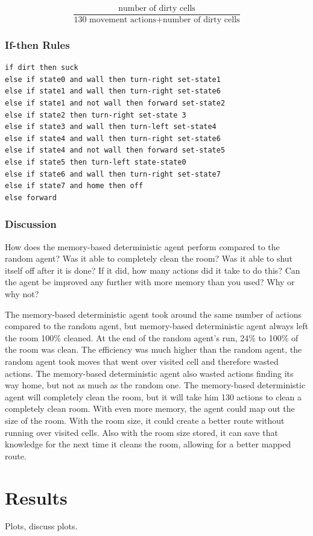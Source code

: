 \documentclass[a4paper,10pt]{article}
\begin{document}
\[\frac{\mbox{number of dirty cells}}{\mbox{130 movement actions} + \mbox{number of dirty cells}}\] 

\subsubsection{If-then Rules}
\begin{verbatim}
if dirt then suck
else if state0 and wall then turn-right set-state1
else if state1 and wall then turn-right set-state6
else if state1 and not wall then forward set-state2
else if state2 then turn-right set-state 3
else if state3 and wall then turn-left set-state4
else if state4 and wall then turn-right set-state6
else if state4 and not wall then forward set-state5
else if state5 then turn-left state-state0
else if state6 and wall then turn-right set-state7
else if state7 and home then off
else forward
\end{verbatim}

\subsubsection{Discussion}
How does the memory-based deterministic agent perform compared to the random agent? Was it able to completely clean the room? Was it able to shut itself off after it is done? If it did, how many actions did it take to do this? Can the agent be improved any further with more memory than you used? Why or why not?

The memory-based deterministic agent took around the same number of actions compared to the random agent, but memory-based deterministic agent always left the room 100\% cleaned. 
At the end of the random agent's run, 24\% to 100\% of the room was clean. 
The efficiency was much higher than the random agent, the random agent took moves that went over visited cell and therefore wasted actions. 
The memory-based deterministic agent also wasted actions finding its way home, but not as much as the random one. 
The memory-based deterministic agent will completely clean the room, but it will take him 130 actions to clean a completely clean room. 
With even more memory, the agent could map out the size of the room.
With the room size, it could create a better route without running over visited cells. 
Also with the room size stored, it can save that knowledge for the next time it cleans the room, allowing for a better mapped route.


\section{Results}
Plots, discuss plots.
\end{document}
